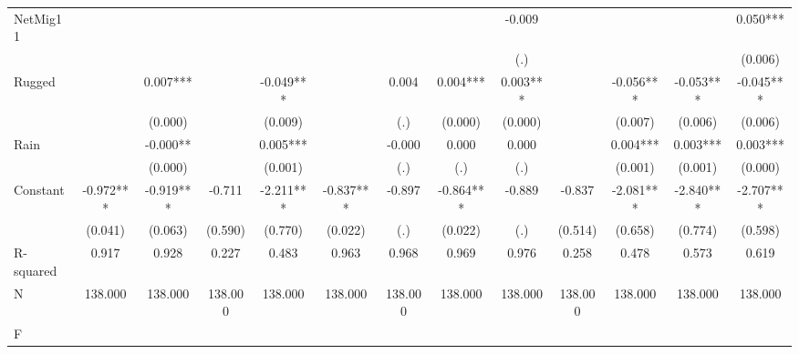 {\begin{tabular}{l*{12}{c}}
NetMig11            &               &               &               &               &               &               &               &      -0.009   &               &               &               &       0.050***\\
                    &               &               &               &               &               &               &               &         (.)   &               &               &               &     (0.006)   \\
Rugged              &               &       0.007***&               &      -0.049***&               &       0.004   &       0.004***&       0.003***&               &      -0.056***&      -0.053***&      -0.045***\\
                    &               &     (0.000)   &               &     (0.009)   &               &         (.)   &     (0.000)   &     (0.000)   &               &     (0.007)   &     (0.006)   &     (0.006)   \\
Rain                &               &      -0.000** &               &       0.005***&               &      -0.000   &       0.000   &       0.000   &               &       0.004***&       0.003***&       0.003***\\
                    &               &     (0.000)   &               &     (0.001)   &               &         (.)   &         (.)   &         (.)   &               &     (0.001)   &     (0.001)   &     (0.000)   \\
Constant            &      -0.972***&      -0.919***&      -0.711   &      -2.211***&      -0.837***&      -0.897   &      -0.864***&      -0.889   &      -0.837   &      -2.081***&      -2.840***&      -2.707***\\
                    &     (0.041)   &     (0.063)   &     (0.590)   &     (0.770)   &     (0.022)   &         (.)   &     (0.022)   &         (.)   &     (0.514)   &     (0.658)   &     (0.774)   &     (0.598)   \\
\hline
R-squared           &       0.917   &       0.928   &       0.227   &       0.483   &       0.963   &       0.968   &       0.969   &       0.976   &       0.258   &       0.478   &       0.573   &       0.619   \\
N                   &     138.000   &     138.000   &     138.000   &     138.000   &     138.000   &     138.000   &     138.000   &     138.000   &     138.000   &     138.000   &     138.000   &     138.000   \\
F                   &               &               &               &               &               &               &               &               &               &               &               &               \\
\hline\hline
\end{tabular}
}

